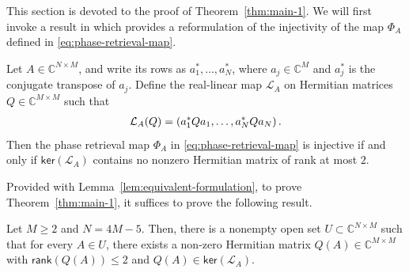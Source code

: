 \documentclass[11pt,reqno]{amsart}
\def\ker{{\mathsf{ker}}}
\begin{document}
This section is devoted to the proof of Theorem~\ref{thm:main-1}. We will first invoke a result in \cite{bandeira2014saving} which provides a reformulation of the injectivity of the map $\Phi_A$ defined in \eqref{eq:phase-retrieval-map}.
\begin{lem}{\label{lem:equivalent-formulation}}
    Let $A \in \mathbb C^{N \times M}$, and write its rows as $a_1^{*},\ldots,a_N^{*}$, where $a_j \in \mathbb C^{M}$ and $a_j^{*}$ is the conjugate transpose of $a_j$. Define the real-linear map $\mathcal L_A$ on Hermitian matrices $Q \in \mathbb C^{M \times M}$ such that
    \begin{align}{\label{eq:def-mathcal-L-A}}
        \mathcal L_A(Q) = (a_1^* Q a_1,\ldots,a_N^* Q a_N) \,.
    \end{align}
    Then the phase retrieval map $\Phi_A$ in \eqref{eq:phase-retrieval-map} is injective if and only if $\mathsf{ker}(\mathcal L_A)$ contains no nonzero Hermitian matrix of rank at most $2$.
\end{lem}
Provided with Lemma~\ref{lem:equivalent-formulation}, to prove Theorem~\ref{thm:main-1}, it suffices to prove the following result.
\begin{lem}{\label{lem:main-1}}
    Let $M \geq 2$ and $N=4M-5$. Then, there is a nonempty open set $U \subset \mathbb C^{N\times M}$ such that for every $A \in U$, there exists a non-zero Hermitian matrix $Q(A) \in \mathbb C^{M\times M}$ with $\mathsf{rank}(Q(A)) \leq 2$ and $Q(A) \in \ker(\mathcal L_A)$.
\end{lem}
\end{document}
